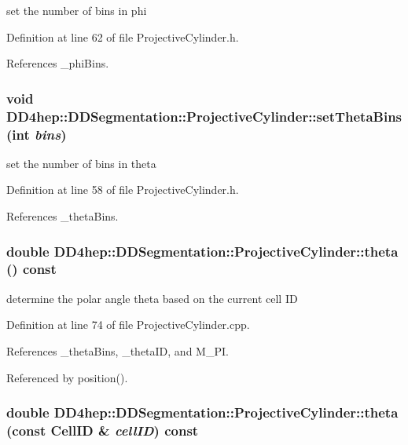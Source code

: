 set the number of bins in phi 

Definition at line 62 of file ProjectiveCylinder.h.

References \_\-phiBins.\hypertarget{class_d_d4hep_1_1_d_d_segmentation_1_1_projective_cylinder_a24dee799078dacde34e689b0b834e141}{
\subsubsection[{setThetaBins}]{\setlength{\rightskip}{0pt plus 5cm}void DD4hep::DDSegmentation::ProjectiveCylinder::setThetaBins (int {\em bins})}}
\label{class_d_d4hep_1_1_d_d_segmentation_1_1_projective_cylinder_a24dee799078dacde34e689b0b834e141}


set the number of bins in theta 

Definition at line 58 of file ProjectiveCylinder.h.

References \_\-thetaBins.\hypertarget{class_d_d4hep_1_1_d_d_segmentation_1_1_projective_cylinder_af9bfe1b999161fe989798b29913cba54}{
\subsubsection[{theta}]{\setlength{\rightskip}{0pt plus 5cm}double DD4hep::DDSegmentation::ProjectiveCylinder::theta () const}}
\label{class_d_d4hep_1_1_d_d_segmentation_1_1_projective_cylinder_af9bfe1b999161fe989798b29913cba54}


determine the polar angle theta based on the current cell ID 

Definition at line 74 of file ProjectiveCylinder.cpp.

References \_\-thetaBins, \_\-thetaID, and M\_\-PI.

Referenced by position().\hypertarget{class_d_d4hep_1_1_d_d_segmentation_1_1_projective_cylinder_aa4145f3b6bb017c50ff5f0102ebfd31f}{
\subsubsection[{theta}]{\setlength{\rightskip}{0pt plus 5cm}double DD4hep::DDSegmentation::ProjectiveCylinder::theta (const {\bf CellID} \& {\em cellID}) const}}
\label{class_d_d4hep_1_1_d_d_segmentation_1_1_projective_cylinder_aa4145f3b6bb017c50ff5f0102ebfd31f}


